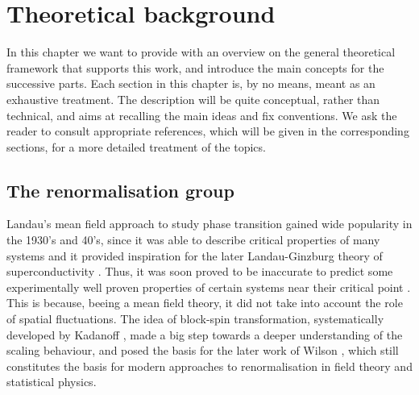 \chapter{Theoretical background}
\label{chap:background}
In this chapter we want to provide with an overview on the general theoretical framework that supports this work, and introduce the main concepts for the successive parts. Each section in this chapter is, by no means, meant as an exhaustive treatment. The description will be quite conceptual, rather than technical, and aims at recalling the main ideas and fix conventions. We ask the reader to consult appropriate references,  which will be given in the corresponding sections, for a more detailed treatment of the topics. \\

\section{The renormalisation group}
\label{sec:RG}
Landau's mean field approach to study phase transition \cite{Landau:1937obd} gained wide popularity in the 1930's and 40's, since it was able to describe critical properties of many systems and it provided inspiration for the later Landau-Ginzburg theory of superconductivity \cite{ginzburg}. Thus, it was soon proved to be inaccurate to predict some experimentally well proven properties of certain systems near their critical point \cite{Cao:1999pw}. This is because, beeing a mean field theory, it did not take into account the role of spatial fluctuations.
The idea of block-spin transformation, systematically developed by Kadanoff \cite{PhysicsPhysiqueFizika_2_263}, made a big step towards a deeper understanding of the scaling behaviour, and posed the basis for the later work of Wilson \cite{WilsonRG1,WilsonRG2,WilsonFisher}, which still constitutes the basis for modern approaches to renormalisation in field theory and statistical physics.\\


